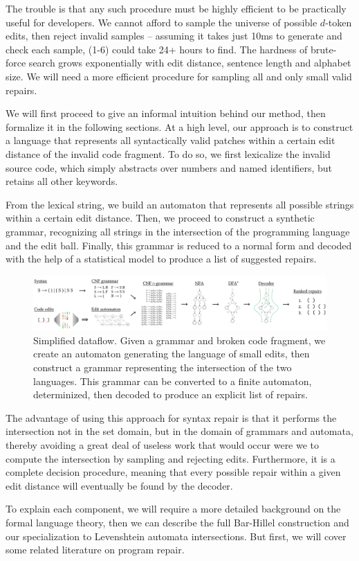 The trouble is that any such procedure must be highly efficient to be practically useful for developers. We cannot afford to sample the universe of possible $d$-token edits, then reject invalid samples -- assuming it takes just 10ms to generate and check each sample, (1-6) could take 24+ hours to find. The hardness of brute-force search grows exponentially with edit distance, sentence length and alphabet size. We will need a more efficient procedure for sampling all and only small valid repairs.

We will first proceed to give an informal intuition behind our method, then formalize it in the following sections. At a high level, our approach is to construct a language that represents all syntactically valid patches within a certain edit distance of the invalid code fragment. To do so, we first lexicalize the invalid source code, which simply abstracts over numbers and named identifiers, but retains all other keywords.

From the lexical string, we build an automaton that represents all possible strings within a certain edit distance. Then, we proceed to construct a synthetic grammar, recognizing all strings in the intersection of the programming language and the edit ball. Finally, this grammar is reduced to a normal form and decoded with the help of a statistical model to produce a list of suggested repairs.

\begin{figure}[h!]
  \includegraphics[width=\textwidth]{content/figures/flow.pdf}\vspace{-1pt}
  \caption{Simplified dataflow. Given a grammar and broken code fragment, we create an automaton generating the language of small edits, then construct a grammar representing the intersection of the two languages. This grammar can be converted to a finite automaton, determinized, then decoded to produce an explicit list of repairs.}\label{fig:arch_simp}
\end{figure}

The advantage of using this approach for syntax repair is that it performs the intersection not in the set domain, but in the domain of grammars and automata, thereby avoiding a great deal of useless work that would occur were we to compute the intersection by sampling and rejecting edits. Furthermore, it is a complete decision procedure, meaning that every possible repair within a given edit distance will eventually be found by the decoder.

To explain each component, we will require a more detailed background on the formal language theory, then we can describe the full Bar-Hillel construction and our specialization to Levenshtein automata intersections. But first, we will cover some related literature on program repair.

\clearpage